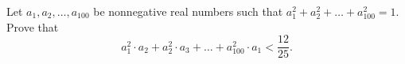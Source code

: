 Let $ a_1, a_2, \ldots, a_{100}$ be nonnegative real numbers such that $ a^2_1 + a^2_2 + \ldots + a^2_{100} = 1.$ Prove that\[ a^2_1 \cdot a_2 + a^2_2 \cdot a_3 + \ldots + a^2_{100} \cdot a_1 < \frac {12}{25}.
\]
